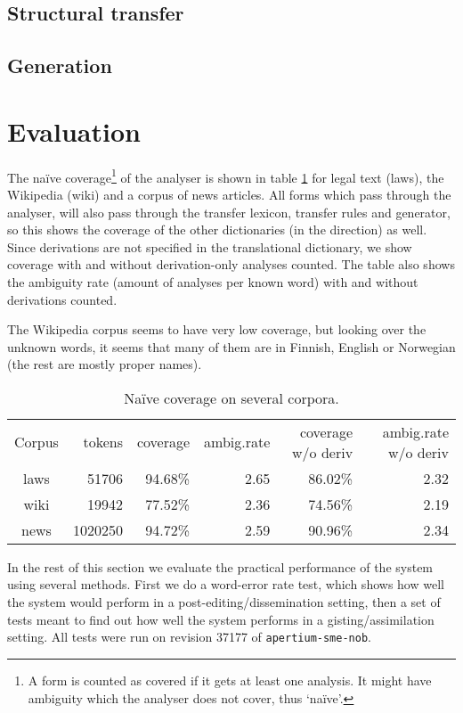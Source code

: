 \subsection{Structural transfer}
\label{sec:structural-transfer}

\subsection{Generation}

\section{Evaluation}
\label{sec:eval}
The naïve coverage\footnote{A form is counted as covered if it gets at
  least one analysis. It might have ambiguity which the analyser does
  not cover, thus `naïve'.} of the analyser is shown in table
\ref{table:cov} for legal text (laws), the \sme{} Wikipedia (wiki) and
a corpus of \sme{} news articles. All forms which pass through the
analyser, will also pass through the transfer lexicon, transfer rules
and generator, so this shows the coverage of the other dictionaries
(in the \smenob{} direction) as well. Since derivations are not
specified in the translational dictionary, we show coverage with and
without derivation-only analyses counted. The table also shows the
ambiguity rate (amount of analyses per known word) with and without
derivations counted. 

The Wikipedia corpus seems to have very low coverage, but looking over
the unknown words, it seems that many of them are in Finnish, English
or Norwegian (the rest are mostly proper names).


\begin{table}
  \begin{center}
  \begin{tabular}{crrrrr}
   Corpus     & tokens   & coverage & ambig.rate  & coverage w/o deriv & ambig.rate w/o deriv \\
   laws       &  51706   & 94.68\%  & 2.65        & 86.02\%            & 2.32 \\
   wiki       & 19942    & 77.52\%  & 2.36        & 74.56\%            & 2.19 \\
   news       & 1020250  & 94.72\%  & 2.59        & 90.96\%            & 2.34 \\
  \end{tabular}
    \caption{Naïve coverage on several corpora.}
    \label{table:cov}
  \end{center}
\end{table}
In the rest of this section we evaluate the practical performance of
the system using several methods. First we do a word-error rate test,
which shows how well the system would perform in a
post-editing/dissemination setting, then a set of tests meant to find
out how well the system performs in a gisting/assimilation setting.
All tests were run on revision 37177 of \texttt{apertium-sme-nob}.



